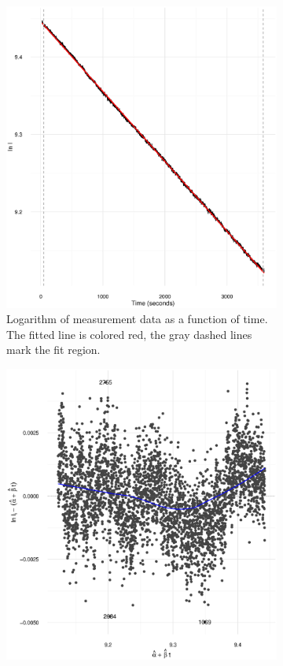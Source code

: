 \documentclass[reprint]{revtex4-1}
\newcommand{\scl}{.4}
\begin{document}
\begin{figure}
\centering
\begin{subfigure}{.5\textwidth}
\includegraphics[scale=\scl]{img/Run969_Data_AND_Fit.eps}
\caption{Logarithm of measurement data as a function of time. The fitted line is colored red, the gray dashed lines mark the fit region.}
\end{subfigure}
\begin{subfigure}{.5\textwidth}
\includegraphics[scale=\scl]{img/Run969_Res_VS_Fit.eps}

\end{subfigure}
\end{figure}
\end{document}
